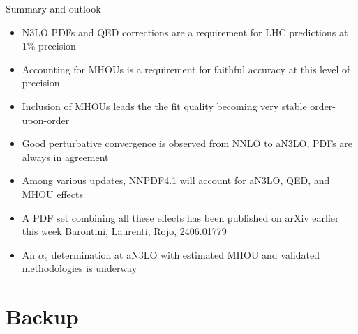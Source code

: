 \documentclass[8pt,t]{beamer}
\begin{document}
\begin{frame}[c]{Summary and outlook}
  \begin{itemize}\setlength{\itemsep}{10pt}
    \item N3LO PDFs and QED corrections are a requirement for LHC predictions at 1\% precision
    \item Accounting for MHOUs is a requirement for faithful accuracy at this level of precision
    \item Inclusion of MHOUs leads the the fit quality becoming very stable order-upon-order
    \item Good perturbative convergence is observed from NNLO to aN3LO, PDFs are always in agreement
    \item Among various updates, NNPDF4.1 will account for aN3LO, QED, and MHOU effects
    \item A PDF set combining all these effects has been published on arXiv earlier this week {\color{gray} \footnotesize Barontini, Laurenti, Rojo, \hyperlink{https://arxiv.org/abs/2406.01779}{2406.01779}}
    \item An $\alpha_s$ determination at aN3LO with estimated MHOU and validated methodologies is underway
  \end{itemize}

  \vspace*{7em}
\end{frame}



\appendix
\section{Backup}


\end{document}
